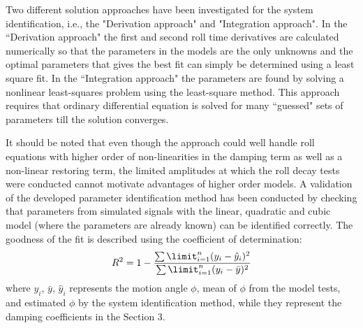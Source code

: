 Two different solution approaches have been investigated for the system identification, i.e., the "Derivation approach" and "Integration approach". In the ``Derivation approach" the first and second roll time derivatives are calculated numerically so that the parameters in the models are the only unknowns and the optimal parameters that gives the best fit can simply be determined using a least square fit.
In the ``Integration approach" the parameters are found by solving a nonlinear least-squares problem using the least-square method. This approach requires that ordinary differential equation is solved for many ``guessed" sets of parameters till the solution converges.

It should be noted that even though the approach could well handle roll equations with higher order of non-linearities in the damping term as well as a non-linear restoring term, the limited amplitudes at which the roll decay tests were conducted cannot motivate advantages of higher order models. A validation of the developed parameter identification method has been conducted by checking that parameters from simulated signals with the linear, quadratic and cubic model  (where the parameters are already known) can be identified correctly. 
The goodness of the fit is described using the coefficient of determination:
\begin{equation} \label{eq:R2}
R^2=1-\frac{\sum\limit_{i=1}^{n}(y_i-\hat{y}_i)^2}{\sum\limit_{i=1}^{n}(y_i-\bar{y})^2}
\end{equation}
where $y_i$, $\bar y$, $\hat{y}_i$ represents the motion angle $\phi$, mean of $\phi$ from the model tests, and estimated $\phi$ by the system identification method, while they represent the damping coefficients in the Section 3.      


